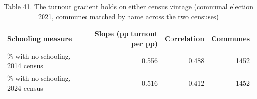 \begin{table}
\caption{Table 41. The turnout gradient holds on either census vintage (communal election 2021, communes matched by name across the two censuses)}
\label{tab:T41_turnout_on_both_censuses}
\begin{tabular}{lrrr}
\toprule
Schooling measure & Slope (pp turnout per pp) & Correlation & Communes \\
\midrule
\% with no schooling, 2014 census & 0.556 & 0.488 & 1452 \\
\% with no schooling, 2024 census & 0.516 & 0.412 & 1452 \\
\bottomrule
\end{tabular}
\end{table}
